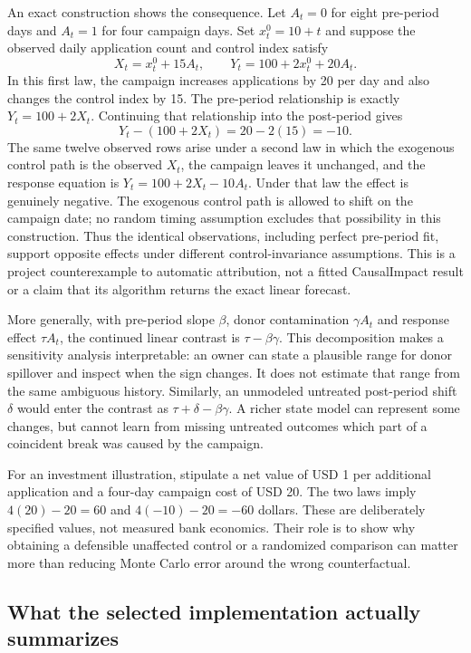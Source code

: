 An exact construction shows the consequence. Let \(A_t=0\) for eight
pre-period days and \(A_t=1\) for four campaign days. Set
\(x_t^0=10+t\) and suppose the observed daily application count and control
index satisfy
\[
 X_t=x_t^0+15A_t,\qquad
 Y_t=100+2x_t^0+20A_t.
\]
In this first law, the campaign increases applications by 20 per day and
also changes the control index by 15. The pre-period relationship is exactly
\(Y_t=100+2X_t\). Continuing that relationship into the post-period gives
\[
 Y_t-(100+2X_t)=20-2(15)=-10.
\]
The same twelve observed rows arise under a second law in which the
exogenous control path is the observed \(X_t\), the campaign leaves it
unchanged, and the response equation is
\(Y_t=100+2X_t-10A_t\). Under that law the effect is genuinely negative.
The exogenous control path is allowed to shift on the campaign date; no
random timing assumption excludes that possibility in this construction.
Thus the identical observations, including perfect pre-period fit, support
opposite effects under different control-invariance assumptions. This is a
project counterexample to automatic attribution, not a fitted CausalImpact
result or a claim that its algorithm returns the exact linear forecast.
\citep{exec13_cimpact_examples}

More generally, with pre-period slope \(\beta\), donor contamination
\(\gamma A_t\) and response effect \(\tau A_t\), the continued linear
contrast is \(\tau-\beta\gamma\). This decomposition makes a sensitivity
analysis interpretable: an owner can state a plausible range for donor
spillover and inspect when the sign changes. It does not estimate that range
from the same ambiguous history. Similarly, an unmodeled untreated
post-period shift \(\delta\) would enter the contrast as
\(\tau+\delta-\beta\gamma\). A richer state model can represent some
changes, but cannot learn from missing untreated outcomes which part of a
coincident break was caused by the campaign.

For an investment illustration, stipulate a net value of USD 1 per additional
application and a four-day campaign cost of USD 20. The two laws imply
\(4(20)-20=60\) and \(4(-10)-20=-60\) dollars. These are deliberately
specified values, not measured bank economics. Their role is to show why
obtaining a defensible unaffected control or a randomized comparison can
matter more than reducing Monte Carlo error around the wrong counterfactual.
\citep{exec13_cimpact_examples}

\subsection{What the selected implementation actually summarizes}

